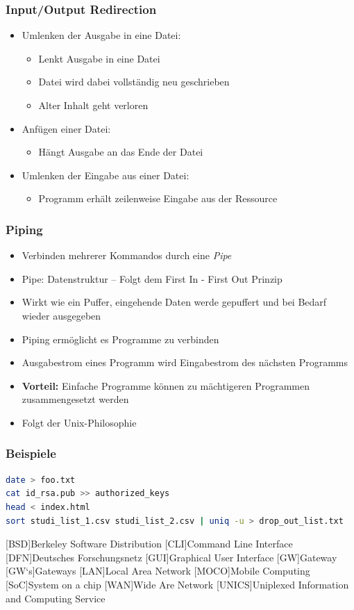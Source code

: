 \documentclass[xcolor=dvipsnames,aspectratio=169]{beamer}
\begin{document}
\begin{frame}
	\frametitle{Input/Output Redirection}
\begin{itemize}
	\item Umlenken der Ausgabe in eine Datei: \keys{>}
		\begin{itemize}
			\item Lenkt Ausgabe in eine Datei
			\item Datei wird dabei vollständig neu geschrieben
			\item Alter Inhalt geht verloren
		\end{itemize}
	\item Anfügen einer Datei: \keys{>>}
	\begin{itemize}
		\item Hängt Ausgabe an das Ende der Datei 
	\end{itemize}
	\item Umlenken der Eingabe aus einer Datei: \keys{<}
		\begin{itemize}
			\item Programm erhält zeilenweise Eingabe aus der Ressource
		\end{itemize}
\end{itemize}
\end{frame}

\begin{frame}
	\frametitle{Piping}
\begin{itemize}
	\item Verbinden mehrerer Kommandos durch eine \emph{Pipe}
	\item Pipe: Datenstruktur -- Folgt dem First In - First Out Prinzip
	\item Wirkt wie ein Puffer, eingehende Daten werde gepuffert und bei Bedarf wieder ausgegeben
	\item Piping ermöglicht es Programme zu verbinden
	\item Ausgabestrom eines Programm wird Eingabestrom des nächsten Programms
	\item \textbf{Vorteil:} Einfache Programme können zu mächtigeren Programmen zusammengesetzt werden
	\item Folgt der Unix-Philosophie
\end{itemize}
\end{frame}

\begin{frame}[fragile]
	\frametitle{Beispiele}
	\begin{lstlisting}[style=Bash, language=Bash]
date > foo.txt
cat id_rsa.pub >> authorized_keys
head < index.html
sort studi_list_1.csv studi_list_2.csv | uniq -u > drop_out_list.txt
	\end{lstlisting}
\end{frame}

\begin{acronym}
[BSD]{Berkeley Software Distribution}
[CLI]{Command Line Interface}
[DFN]{Deutsches Forschungsnetz}
[GUI]{Graphical User Interface}
[GW]{Gateway}
[GW`s]{Gateways}
[LAN]{Local Area Network}
[MOCO]{Mobile Computing}
[SoC]{System on a chip}
[WAN]{Wide Are Network}
[UNICS]{Uniplexed Information and Computing Service}
\end{acronym}
\end{document}

